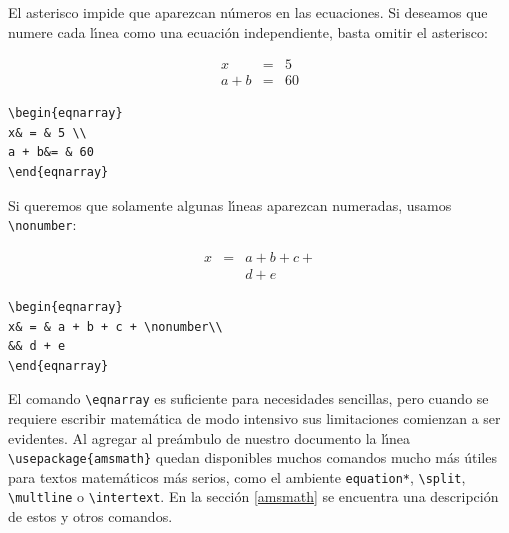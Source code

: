 El asterisco impide que aparezcan n{\'u}meros en las ecuaciones.  Si
deseamos que numere cada l{\'\i}nea como una ecuaci{\'o}n independiente,
basta omitir el asterisco:

\vspace{.3cm}
{\small
\begin{minipage}[c]{5cm}
\begin{eqnarray}
x& = & 5 \\
a + b&= & 60
\end{eqnarray}
\end{minipage}
\hspace{2cm}
\begin{minipage}[t]{5cm}
\begin{verbatim}
\begin{eqnarray}
x& = & 5 \\
a + b&= & 60
\end{eqnarray}
\end{verbatim}
\end{minipage}
}
\vspace{.3cm}

Si queremos que solamente algunas l{\'\i}neas aparezcan numeradas, usamos
\verb+\nonumber+:

\vspace{.3cm}
{\small
\begin{minipage}[c]{5cm}
\begin{eqnarray}
x& = & a + b + c + \nonumber\\
&& d + e
\end{eqnarray}
\end{minipage}
\hspace{2cm}
\begin{minipage}[t]{5cm}
\begin{verbatim}
\begin{eqnarray}
x& = & a + b + c + \nonumber\\
&& d + e
\end{eqnarray}
\end{verbatim}
\end{minipage}
}
\vspace{.3cm}

El comando \verb+\eqnarray+ es suficiente para necesidades sencillas,
pero cuando se requiere escribir matem\'atica de modo intensivo sus
limitaciones comienzan a ser evidentes. Al agregar al pre\'ambulo de
nuestro documento la l\'{\i}nea \verb+\usepackage{amsmath}+ quedan
disponibles muchos comandos mucho m\'as \'utiles para
textos matem\'aticos m\'as serios, como el ambiente \verb+equation*+, 
\verb+\split+,
\verb+\multline+ o \verb+\intertext+. En la secci\'on \ref{amsmath} se
encuentra una descripci\'on de estos y otros comandos.

